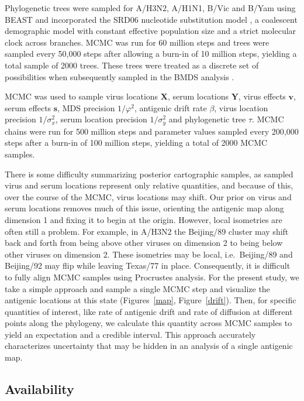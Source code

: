 \documentclass[11pt,oneside,letterpaper]{article}
\newcommand{\viruses}{\mathbf{X}}					%
\newcommand{\sera}{\mathbf{Y}}						%
\newcommand{\ves}{\mathbf{v}}						%
\newcommand{\ses}{\mathbf{s}}						%
\newcommand{\mdssd}{\varphi}						%
\newcommand{\virussd}{\sigma_x}						%
\newcommand{\serumsd}{\sigma_y}						%
\newcommand{\tree}{\tau}							%
\begin{document}
Phylogenetic trees were sampled for A/H3N2, A/H1N1, B/Vic and B/Yam using BEAST \cite{BEAST} and incorporated the SRD06 nucleotide substitution model \cite{Shapiro06}, a coalescent demographic model with constant effective population size and a strict molecular clock across branches.
MCMC was run for 60 million steps and trees were sampled every 50,000 steps after allowing a burn-in of 10 million steps, yielding a total sample of 2000 trees.
These trees were treated as a discrete set of possibilities when subsequently sampled in the BMDS analysis \cite{Pagel04}.

MCMC was used to sample virus locations $\viruses$, serum locations $\sera$, virus effects $\ves$, serum effects $\ses$, MDS precision $1/\mdssd^2$, antigenic drift rate $\beta$, virus location precision $1/\virussd^2$, serum location precision $1/\serumsd^2$ and phylogenetic tree $\tree$.
MCMC chains were run for 500 million steps and parameter values sampled every 200,000 steps after a burn-in of 100 million steps, yielding a total of 2000 MCMC samples.

There is some difficulty summarizing posterior cartographic samples, as sampled virus and serum locations represent only relative quantities, and because of this, over the course of the MCMC, virus locations may shift.
Our prior on virus and serum locations removes much of this issue, orienting the antigenic map along dimension 1 and fixing it to begin at the origin.
However, local isometries are often still a problem.
For example, in A/H3N2 the Beijing/89 cluster may shift back and forth from being above other viruses on dimension 2 to being below other viruses on dimension 2.
These isometries may be local, i.e.\ Beijing/89 and Beijing/92 may flip while leaving Texas/77 in place.
Consequently, it is difficult to fully align MCMC samples using Procrustes analysis.
For the present study, we take a simple approach and sample a single MCMC step and visualize the antigenic locations at this state (Figures~\ref{map}, Figure~\ref{drift}).
Then, for specific quantities of interest, like rate of antigenic drift and rate of diffusion at different points along the phylogeny, we calculate this quantity across MCMC samples to yield an expectation and a credible interval.
This approach accurately characterizes uncertainty that may be hidden in an analysis of a single antigenic map.

\subsection*{Availability}
\end{document}
